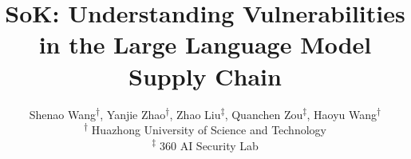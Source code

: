 \documentclass[letterpaper,twocolumn,10pt]{article}
\begin{document}
\title{\Large \bf SoK: Understanding Vulnerabilities in the Large Language Model Supply Chain}


\author{
{\rm Shenao Wang\textsuperscript{$\dag$}, Yanjie Zhao\textsuperscript{$\dag$}, Zhao Liu\textsuperscript{$\ddag$}, Quanchen Zou\textsuperscript{$\ddag$}, Haoyu Wang\textsuperscript{$\dag$}}
\\[0.5em]
\textsuperscript{$\dag$} Huazhong University of Science and Technology\\
\textsuperscript{$\ddag$} 360 AI Security Lab
}

\maketitle
















\end{document}
